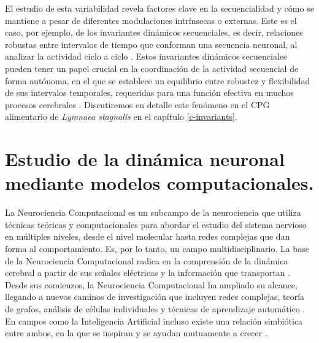El estudio de esta variabilidad revela factores clave en la secuencialidad y cómo se mantiene a pesar de diferentes modulaciones intrínsecas o externas. Este es el caso, por ejemplo, de los invariantes dinámicos secuenciales, es decir, relaciones robustas entre intervalos de tiempo que conforman una secuencia neuronal, al analizar la actividad ciclo a ciclo \parencite{reyes_artificial_2008,elices_robust_2019,garrido-pena_characterization_2021,berbel_emergence_2024}. Estos invariantes dinámicos secuenciales pueden tener un papel crucial en la coordinación de la actividad secuencial de forma autónoma, en el que se establece un equilibrio entre robustez y flexibilidad de sus intervalos temporales, requeridas para una función efectiva en muchos procesos cerebrales \parencite{tatsuno_analysis_2015,ullen_neural_2003,zimnik_independent_2021,zhou_neural_2020,dragoi_cell_2020}. Discutiremos en detalle este fenómeno en el CPG alimentario de \textit{Lymnaea stagnalis} en el capítulo \ref{c-invariants}.


\section{Estudio de la dinámica neuronal mediante modelos computacionales.}
\label{sec:computational neuroscience spanish}
La Neurociencia Computacional es un subcampo de la neurociencia que utiliza técnicas teóricas y computacionales para abordar el estudio del sistema nervioso en múltiples niveles, desde el nivel molecular hasta redes complejas que dan forma al comportamiento. Es, por lo tanto, un campo multidisciplinario. La base de la Neurociencia Computacional radica en la comprensión de la dinámica cerebral a partir de sus señales eléctricas y la información que transportan \parencite{schwiening_brief_2012,catterall_hodgkinhuxley_2012,dimitrov_information_2011,shannon_mathematical_1948}. Desde sus comienzos, la Neurociencia Computacional ha ampliado su alcance, llegando a nuevos caminos de investigación que incluyen redes complejas, teoría de grafos, análisis de células individuales y técnicas de aprendizaje automático \parencite{_30th_2021}. En campos como la Inteligencia Artificial incluso existe una relación simbiótica entre ambos, en la que se inspiran y se ayudan mutuamente a crecer \parencite{amunts_human_2019,wozniak_deep_2020,goncalves_training_2020}.

